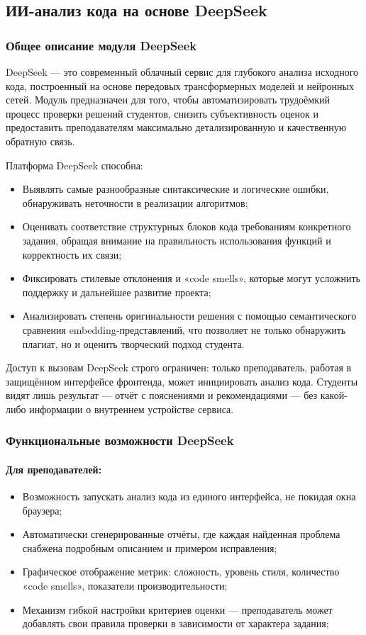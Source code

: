 \subsection{ИИ-анализ кода на основе DeepSeek}

\subsubsection{Общее описание модуля DeepSeek}
DeepSeek — это современный облачный сервис для глубокого анализа исходного кода, построенный на основе передовых трансформерных моделей и нейронных сетей. Модуль предназначен для того, чтобы автоматизировать трудоёмкий процесс проверки решений студентов, снизить субъективность оценок и предоставить преподавателям максимально детализированную и качественную обратную связь. 

Платформа DeepSeek способна:
\begin{itemize}
	\item Выявлять самые разнообразные синтаксические и логические ошибки, обнаруживать неточности в реализации алгоритмов;
	\item Оценивать соответствие структурных блоков кода требованиям конкретного задания, обращая внимание на правильность использования функций и корректность их связи;
	\item Фиксировать стилевые отклонения и «code smells», которые могут усложнить поддержку и дальнейшее развитие проекта;
	\item Анализировать степень оригинальности решения с помощью семантического сравнения embedding‐представлений, что позволяет не только обнаружить плагиат, но и оценить творческий подход студента.
\end{itemize}

Доступ к вызовам DeepSeek строго ограничен: только преподаватель, работая в защищённом интерфейсе фронтенда, может инициировать анализ кода. Студенты видят лишь результат — отчёт с пояснениями и рекомендациями — без какой-либо информации о внутреннем устройстве сервиса.

\subsubsection{Функциональные возможности DeepSeek}

\paragraph{Для преподавателей:}
\begin{itemize}
	\item Возможность запускать анализ кода из единого интерфейса, не покидая окна браузера;
	\item Автоматически сгенерированные отчёты, где каждая найденная проблема снабжена подробным описанием и примером исправления;
	\item Графическое отображение метрик: сложность, уровень стиля, количество «code smells», показатели производительности;
	\item Механизм гибкой настройки критериев оценки — преподаватель может добавлять свои правила проверки в зависимости от характера задания;
\end{itemize}

